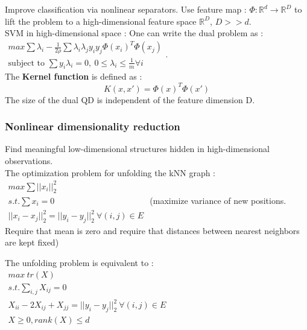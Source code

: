 \documentclass[../main.tex]{subfiles}
\begin{document}
Improve classification via nonlinear separators. Use feature map : $\Phi : \mathbb{R}^d \rightarrow \mathbb{R}^D$ to lift the problem to a high-dimensional feature space $\mathbb{R}^D$, $D>>d$.\\

SVM in high-dimensional space : One can write the dual problem as : $\begin{matrix}
        max \sum \lambda_i - \frac{1}{2\rho} \sum \lambda_i \lambda_j y_i y_j \Phi(x_i)^T \Phi(x_j)\\
        \text{subject to } \sum y_i \lambda_i = 0, \: 0\leq \lambda_i \leq \frac{1}{m} \forall i
    \end{matrix}$.\\
    The \textbf{Kernel function} is defined as : \begin{equation}
        K(x,x') = \Phi(x)^T \Phi(x')
    \end{equation}
    \warning The size of the dual QD is independent of the feature dimension D. \\

    \subsubsection{Nonlinear dimensionality reduction}
    Find meaningful low-dimensional structures hidden in high-dimensional observations.\\
    The optimization problem for unfolding the kNN graph : $\begin{matrix}
        max \sum \lvert \lvert x_i \rvert \rvert_2^2\\
        s.t. \sum x_i = 0\\
        \lvert \lvert x_i-x_j \rvert \rvert_2^2 = \lvert \lvert y_i - y_j \rvert \rvert_2^2 \: \forall(i,j) \in E
    \end{matrix}$
(maximize variance of new positions. Require that mean is zero and require that distances between nearest neighbors are kept fixed)\\

\begin{theorem}
    The unfolding problem is equivalent to : \\
    $\begin{matrix}
        max \: tr(X)\\
        s.t. \sum_{i,j} X_{ij} = 0\\
        X_{ii} - 2 X_{ij} + X_{jj} = \lvert \lvert y_i- y_j\rvert \rvert_2^2 \: \forall(i,j)\in E\\
        X \geq 0, rank(X) \leq d
    \end{matrix}$
    
\end{theorem}
\end{document}
